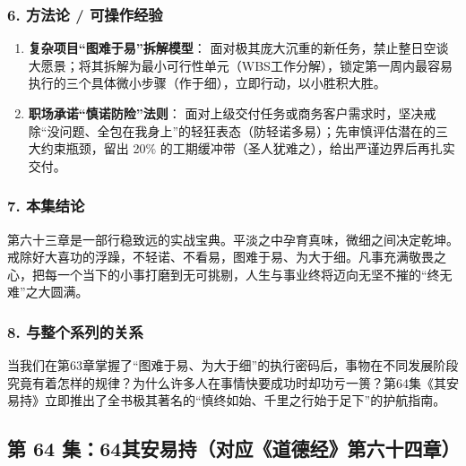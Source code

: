 \subsubsection{6. 方法论 / 可操作经验}
\begin{enumerate}
    \item \textbf{复杂项目“图难于易”拆解模型}：
    面对极其庞大沉重的新任务，禁止整日空谈大愿景；将其拆解为最小可行性单元（WBS工作分解），锁定第一周内最容易执行的三个具体微小步骤（作于细），立即行动，以小胜积大胜。
    \item \textbf{职场承诺“慎诺防险”法则}：
    面对上级交付任务或商务客户需求时，坚决戒除“没问题、全包在我身上”的轻狂表态（防轻诺多易）；先审慎评估潜在的三大约束瓶颈，留出 20\% 的工期缓冲带（圣人犹难之），给出严谨边界后再扎实交付。
\end{enumerate}

\subsubsection{7. 本集结论}
第六十三章是一部行稳致远的实战宝典。平淡之中孕育真味，微细之间决定乾坤。戒除好大喜功的浮躁，不轻诺、不看易，图难于易、为大于细。凡事充满敬畏之心，把每一个当下的小事打磨到无可挑剔，人生与事业终将迈向无坚不摧的“终无难”之大圆满。

\subsubsection{8. 与整个系列的关系}
当我们在第63章掌握了“图难于易、为大于细”的执行密码后，事物在不同发展阶段究竟有着怎样的规律？为什么许多人在事情快要成功时却功亏一篑？第64集《其安易持》立即推出了全书极其著名的“慎终如始、千里之行始于足下”的护航指南。

\clearpage

\subsection{第 64 集：64其安易持（对应《道德经》第六十四章）}
\label{sec:ep64}


